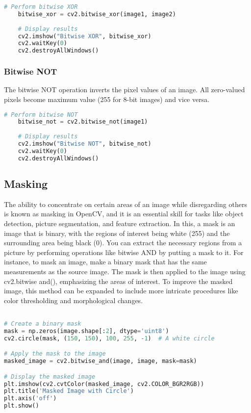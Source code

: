 \begin{lstlisting}[language=Python, caption=Bitwise XOR]
	# Perform bitwise XOR
	bitwise_xor = cv2.bitwise_xor(image1, image2)
	
	# Display results
	cv2.imshow("Bitwise XOR", bitwise_xor)
	cv2.waitKey(0)
	cv2.destroyAllWindows()
\end{lstlisting}


\subsubsection{Bitwise NOT}
The bitwise NOT operation inverts the pixel values of an image. All zero-valued pixels become maximum value (255 for 8-bit images) and vice versa.\cite{OpenCVTeam:2024,Jasmcaus:2024}

\begin{lstlisting}[language=Python, caption=Bitwise NOT]
	# Perform bitwise NOT
	bitwise_not = cv2.bitwise_not(image1)
	
	# Display results
	cv2.imshow("Bitwise NOT", bitwise_not)
	cv2.waitKey(0)
	cv2.destroyAllWindows()
\end{lstlisting}


\subsection{Masking}

The ability to concentrate on certain areas of an image while disregarding others is known as masking in OpenCV, and it is an essential skill for tasks like object detection, picture segmentation, and feature extraction. In this, a mask is an image that is binary, with the regions of interest being white (255) and the surrounding area being black (0). You can extract the necessary regions from a picture by performing operations like bitwise AND by putting a mask to it. For instance, to mask an image, make a binary mask that has the same measurements as the source image. The mask is then applied to the image using cv2.bitwise and(), emphasizing the areas of interest. To improve the masked image, this method can be expanded to include more intricate procedures like color thresholding and morphological changes.\cite{Dawson:2014}
\begin{lstlisting}[language=Python, caption=Masking Example in OpenCV]

# Create a binary mask
mask = np.zeros(image.shape[:2], dtype='uint8')
cv2.circle(mask, (150, 150), 100, 255, -1)  # A white circle

# Apply the mask to the image
masked_image = cv2.bitwise_and(image, image, mask=mask)

# Display the masked image
plt.imshow(cv2.cvtColor(masked_image, cv2.COLOR_BGR2RGB))
plt.title('Masked Image with Circle')
plt.axis('off')
plt.show()
\end{lstlisting}

